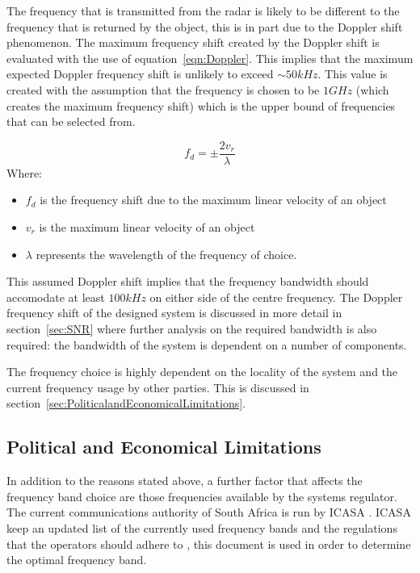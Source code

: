 \documentclass[11pt]{witseiepaper}
\begin{document}
The frequency that is transmitted from the radar is likely to be different to the frequency that is returned by the object, this is in part due to the Doppler shift phenomenon. The maximum frequency shift created by the Doppler shift is evaluated with the use of equation~\ref{eqn:Doppler}. This implies that the maximum expected Doppler frequency shift is unlikely to exceed $\sim 50 kHz$. This value is created with the assumption that the frequency is chosen to be $1 GHz$ (which creates the maximum frequency shift) which is the upper bound of frequencies that can be selected from.


\begin{equation} \label{eqn:Doppler}
    f_{d} = \pm \frac{2 v_{r}}{\lambda}    
\end{equation}
Where:
\begin{itemize}
    \item $f_{d}$ is the frequency shift due to the maximum linear velocity of an object
    \item $v_{r}$ is the maximum linear velocity of an object
    \item $\lambda$ represents the wavelength of the frequency of choice.
\end{itemize}

This assumed Doppler shift implies that the frequency bandwidth should accomodate at least $100 kHz$ on either side of the centre frequency.
The Doppler frequency shift of the designed system is discussed in more detail in section~\ref{sec:SNR} where further analysis on the required bandwidth is also required: the bandwidth of the system is dependent on a number of components.


The frequency choice is highly dependent on the locality of the system and the current frequency usage by other parties. This is discussed in section~\ref{sec:PoliticalandEconomicalLimitations}.


\subsection{Political and Economical Limitations} \label{PoliticalandEconomicalLimitations}

In addition to the reasons stated above, a further factor that affects the frequency band choice are those frequencies available by the systems regulator. The current communications authority of South Africa is run by ICASA \cite{ICASA}.
ICASA keep an updated list of the currently used frequency bands and the regulations that the operators should adhere to \cite{frequencyAllocation}, this document is used in order to determine the optimal frequency band.
\end{document}
